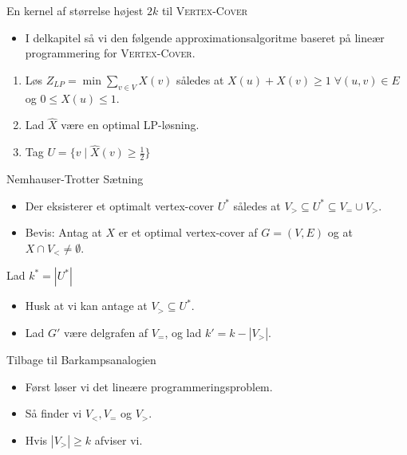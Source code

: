 \begin{frame}{En kernel af størrelse højest $2k$ til \textsc{Vertex-Cover}}
    \begin{itemize}
        \item I delkapitel så vi den følgende approximationsalgoritme baseret på lineær programmering for \textsc{Vertex-Cover}.
    \end{itemize}
    \begin{enumerate}
        \item Løs $Z_{LP} = \min \sum_{v \in V} X(v)$ således at $X(u)+X(v) \ge 1 \; \forall (u,v) \in E$ og $0 \le X(u) \le 1$.
        \item Lad $\hat{X}$ være en optimal LP-løsning.
        \item Tag $U = \{v \mid \hat{X}(v) \ge \frac{1}{2}\}$
    \end{enumerate}
\end{frame}

\begin{frame}{Nemhauser-Trotter Sætning}
    \begin{itemize}
        \item Der eksisterer et optimalt vertex-cover $U^{*}$ således at $V_{>} \subseteq U^{*} \subseteq V_{=} \cup V_{>}$.
        \item Bevis: Antag at $X$ er et optimal vertex-cover af $G = (V,E)$ og at $X \cap V_{<} \ne \emptyset$.
    \end{itemize}
\end{frame}

\begin{frame}{Lad $k^{*} = |U^{*}|$}
    \begin{itemize}
        \item Husk at vi kan antage at $V_{>} \subseteq U^{*}$.
        \item Lad $G' $ være delgrafen af $V_{=}$, og lad $k' = k - |V_{>}|$.
    \end{itemize}
\end{frame}

\begin{frame}{Tilbage til Barkampsanalogien}
    \begin{itemize}
        \item Først løser vi det lineære programmeringsproblem.
        \item Så finder vi $V_{<}, V_{=}$ og $V_{>}$.
        \item Hvis $|V_{>}| \ge k$ afviser vi.
    \end{itemize}
\end{frame}

